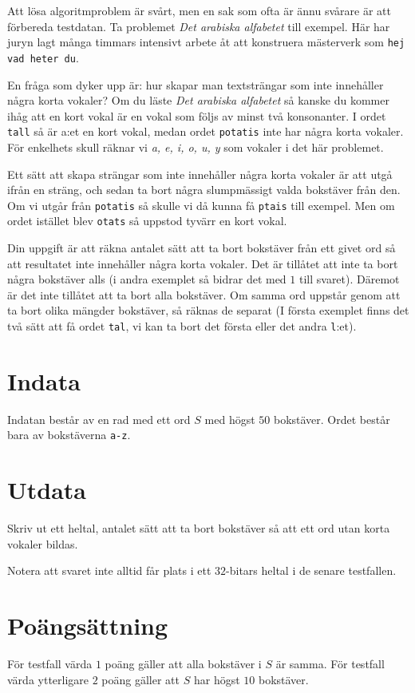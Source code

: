 Att lösa algoritmproblem är svårt, men en sak som ofta är ännu svårare är att förbereda
testdatan. Ta problemet \textit{Det arabiska alfabetet} till exempel. Här har juryn lagt
många timmars intensivt arbete åt att konstruera mästerverk som \texttt{hej vad heter du}.


En fråga som dyker upp är: hur skapar man textsträngar som inte innehåller några korta vokaler?
Om du läste \textit{Det arabiska alfabetet} så kanske du kommer ihåg att en kort vokal är en
vokal som följs av minst två konsonanter. I ordet \texttt{tall} så är a:et en kort vokal, medan
ordet \texttt{potatis} inte har några korta vokaler. För enkelhets skull räknar vi  \textit{a, e, i, o, u, y} 
som vokaler i det här problemet.


Ett sätt att skapa strängar som inte innehåller några korta vokaler är att utgå ifrån en sträng,
och sedan ta bort några slumpmässigt valda bokstäver från den. Om vi utgår från \texttt{potatis} så 
skulle vi då kunna få \texttt{ptais} till exempel. Men om ordet istället blev \texttt{otats} så uppstod
tyvärr en kort vokal.


Din uppgift är att räkna antalet sätt att ta bort bokstäver från ett givet ord så att resultatet inte
innehåller några korta vokaler. Det är tillåtet att inte ta bort några bokstäver alls (i andra exemplet
så bidrar det med $1$ till svaret). Däremot är det inte tillåtet att ta bort alla bokstäver. Om samma ord
uppstår genom att ta bort olika mängder bokstäver, så räknas de separat (I första exemplet finns det två sätt
att få ordet \texttt{tal}, vi kan ta bort det första eller det andra \texttt{l}:et).

\section*{Indata}
Indatan består av en rad med ett ord $S$ med högst $50$ bokstäver. Ordet består bara av bokstäverna \texttt{a-z}.

\section*{Utdata}
Skriv ut ett heltal, antalet sätt att ta bort bokstäver så att ett ord utan korta vokaler bildas.

Notera att svaret inte alltid får plats i ett $32$-bitars heltal i de senare testfallen.

\section*{Poängsättning}
För testfall värda $1$ poäng gäller att alla bokstäver i $S$ är samma.
För testfall värda ytterligare $2$ poäng gäller att $S$ har högst $10$ bokstäver.
